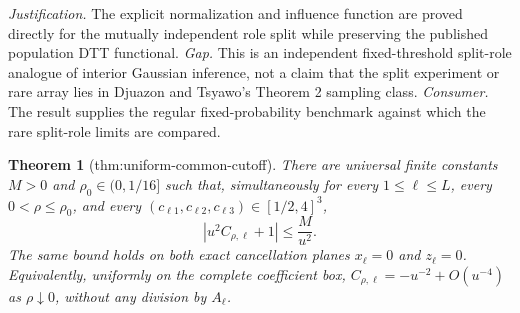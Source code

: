 \documentclass{article}
\newtheorem{theorem}{Theorem}
\begin{document}
\par\smallskip\noindent \textit{Justification.} The explicit normalization and influence function are proved directly for the mutually independent role split while preserving the published population DTT functional. \textit{Gap.} This is an independent fixed-threshold split-role analogue of interior Gaussian inference, not a claim that the split experiment or rare array lies in Djuazon and Tsyawo's Theorem 2 sampling class. \textit{Consumer.} The result supplies the regular fixed-probability benchmark against which the rare split-role limits are compared.

\begin{theorem}[thm:uniform-common-cutoff]\label{thm:uniform-common-cutoff}
There are universal finite constants \(M>0\) and \(\rho_0\in(0,1/16]\) such that, simultaneously for every \(1\le\ell\le L\), every \(0<\rho\le\rho_0\), and every \((c_{\ell1},c_{\ell2},c_{\ell3})\in[1/2,4]^3\),
\[
\left|u^2 C_{\rho,\ell}+1\right|\le \frac{M}{u^2}.
\]
The same bound holds on both exact cancellation planes \(x_\ell=0\) and \(z_\ell=0\).  Equivalently, uniformly on the complete coefficient box, \(C_{\rho,\ell}=-u^{-2}+O(u^{-4})\) as \(\rho\downarrow0\), without any division by \(A_\ell\).
\end{theorem}
\end{document}
